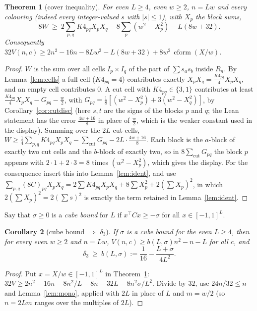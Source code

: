 \documentclass[11pt]{amsart}
\newtheorem{theorem}{Theorem}[section]
\newtheorem{corollary}[theorem]{Corollary}
\theoremstyle{remark}
\newcommand{\mono}{V}
\begin{document}
\begin{theorem}[cover inequality]\label{thm:cover}
For even $L\ge4$, even $w\ge2$, $n=Lw$ and every colouring (indeed every integer-valued $s$ with $|s|\le1$), with $X_p$ the block sums,
\[8W\ \ge\ 2\sum_{p,q}K4_{pq}X_pX_q-8\sum_p(w^2-X_p^2)-L(8w+32).\]
Consequently $32\mono(n,c)\ge2n^2-16n-8Lw^2-L(8w+32)+8w^2\,\operatorname{cform}(X/w)$.
\end{theorem}
\begin{proof}
$W$ is the sum over all cells $I_p\times I_q$ of the part of $\sum s_as_b$ inside $R_n$. By Lemma~\ref{lem:cells} a full cell ($K4_{pq}=4$) contributes exactly $X_pX_q=\frac{K4_{pq}}4X_pX_q$, and an empty cell contributes $0$.
A cut cell with $K4_{pq}\in\{3,1\}$ contributes at least $\frac{K4_{pq}}4X_pX_q-G_{pq}-\frac w2$, with $G_{pq}=\frac18[(w^2-X_p^2)+3(w^2-X_q^2)]$, by Corollary~\ref{cor:cutdisc} (here $s,t$ are the signs of the blocks $p$ and $q$; the Lean statement has the error $\frac{4w+16}8$ in place of $\frac w2$, which is the weaker constant used in the display). Summing over the $2L$ cut cells,
$W\ge\frac14\sum_{p,q}K4_{pq}X_pX_q-\sum_{\text{cut}}G_{pq}-2L\cdot\frac{4w+16}8$. Each block is the $a$-block of exactly two cut cells and the $b$-block of exactly two, so in $8\sum_{\text{cut}}G_{pq}$ the block $p$ appears with
$2\cdot1+2\cdot3=8$ times $(w^2-X_p^2)$, which gives the display. For the consequence insert this into Lemma~\ref{lem:ident}, and use $\sum_{p,q}(8C)_{pq}X_pX_q=2\sum K4_{pq}X_pX_q+8\sum X_p^2+2(\sum X_p)^2$, in which $2(\sum X_p)^2=2(\sum s)^2$ is exactly the term retained in Lemma~\ref{lem:ident}.
\end{proof}

Say that $\sigma\ge0$ is a \emph{cube bound} for $L$ if $x^{\top}Cx\ge-\sigma$ for all $x\in[-1,1]^L$.

\begin{corollary}[cube bound $\Rightarrow$ $\delta_3$]\label{cor:cube}
If $\sigma$ is a cube bound for the even $L\ge4$, then for every even $w\ge2$ and $n=Lw$, $\mono(n,c)\ge b(L,\sigma)n^2-n-L$ for all $c$, and
\[\delta_3\ \ge\ b(L,\sigma):=\frac1{16}-\frac{L+\sigma}{4L^2}.\]
\end{corollary}
\begin{proof}
Put $x=X/w\in[-1,1]^L$ in Theorem~\ref{thm:cover}: $32\mono\ge2n^2-16n-8n^2/L-8n-32L-8n^2\sigma/L^2$. Divide by $32$, use $24n/32\le n$ and Lemma~\ref{lem:mono}, applied with $2L$ in place of $L$ and $m=w/2$ (so $n=2Lm$ ranges over the multiples of $2L$).
\end{proof}
\end{document}
